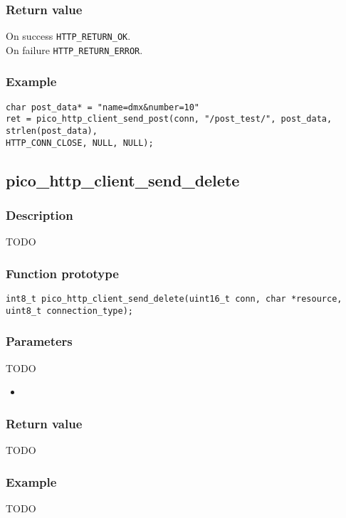 \subsubsection*{Return value}
On success \texttt{HTTP\_RETURN\_OK}.
\\On failure \texttt{HTTP\_RETURN\_ERROR}.
\subsubsection*{Example}
\begin{verbatim}
char post_data* = "name=dmx&number=10"
ret = pico_http_client_send_post(conn, "/post_test/", post_data, strlen(post_data), 
HTTP_CONN_CLOSE, NULL, NULL);
\end{verbatim}


\subsection{pico\_http\_client\_send\_delete}

\subsubsection*{Description}
TODO

\subsubsection*{Function prototype}
\texttt{int8\_t pico\_http\_client\_send\_delete(uint16\_t conn, char *resource, uint8\_t connection\_type);}

\subsubsection*{Parameters}
TODO
\begin{itemize}[noitemsep]
\item \texttt{}
\end{itemize}
\subsubsection*{Return value}
TODO
\subsubsection*{Example}
TODO


